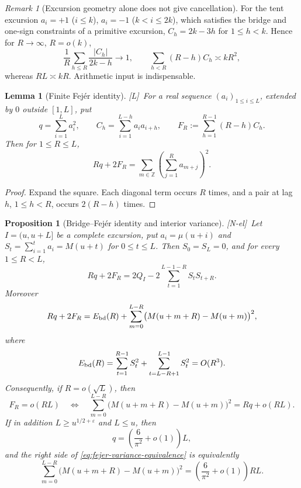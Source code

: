 \documentclass[11pt]{amsart}
\numberwithin{equation}{section}
\theoremstyle{plain}
\newtheorem{proposition}[theorem]{Proposition}
\newtheorem{lemma}[theorem]{Lemma}
\theoremstyle{definition}
\theoremstyle{remark}
\newtheorem{remark}[theorem]{Remark}
\newcommand{\eps}{\varepsilon}
\newcommand{\tagNE}{\textup{[N-el]}}
\newcommand{\tagL}{\textup{[L]}}
\begin{document}
\begin{remark}[Excursion geometry alone does not give cancellation]
\label{rem:tent-chowla}
For the tent excursion $a_i=+1$ ($i\le k$), $a_i=-1$ ($k<i\le2k$), which
satisfies the bridge and one-sign constraints of a primitive excursion,
$C_h=2k-3h$ for $1\le h<k$. Hence for $R\to\infty$, $R=o(k)$,
\[
\frac1R\sum_{h\le R}\frac{|C_h|}{2k-h}\longrightarrow1,
\qquad
\sum_{h<R}(R-h)C_h\asymp kR^2,
\]
whereas $RL\asymp kR$. Arithmetic input is indispensable.
\end{remark}

\begin{lemma}[Finite Fej\'er identity]
\label{lem:fejer}
\tagL\ For a real sequence $(a_i)_{1\le i\le L}$, extended by $0$ outside
$[1,L]$, put
\[
q=\sum_{i=1}^La_i^2,
\qquad
C_h=\sum_{i=1}^{L-h}a_ia_{i+h},
\qquad
F_R:=\sum_{h=1}^{R-1}(R-h)C_h.
\]
Then for $1\le R\le L$,
\begin{equation}
\label{eq:fejer}
Rq+2F_R
=\sum_{m\in\mathbb Z}\left(\sum_{j=1}^{R}a_{m+j}\right)^2.
\end{equation}
\end{lemma}

\begin{proof}
Expand the square. Each diagonal term occurs $R$ times, and a pair at lag
$h$, $1\le h<R$, occurs $2(R-h)$ times.
\end{proof}

\begin{proposition}[Bridge--Fej\'er identity and interior variance]
\label{prop:bridge-fejer}
\tagNE\ Let $I=(u,u+L]$ be a complete excursion, put
$a_i=\mu(u+i)$ and
$S_t=\sum_{i=1}^ta_i=M(u+t)$ for $0\le t\le L$. Then
$S_0=S_L=0$, and for every $1\le R<L$,
\begin{equation}
\label{eq:bridge-fejer-Q}
Rq+2F_R
=2Q_I-2\sum_{t=1}^{L-1-R}S_tS_{t+R}.
\end{equation}
Moreover
\begin{equation}
\label{eq:fejer-interior-boundary}
Rq+2F_R
=E_{\rm bd}(R)
+\sum_{m=0}^{L-R}\bigl(M(u+m+R)-M(u+m)\bigr)^2,
\end{equation}
where
\[
E_{\rm bd}(R)=\sum_{t=1}^{R-1}S_t^2
+\sum_{t=L-R+1}^{L-1}S_t^2
=O(R^3).
\]
Consequently, if $R=o(\sqrt L)$, then
\begin{equation}
\label{eq:fejer-variance-equivalence}
F_R=o(RL)
\quad\Longleftrightarrow\quad
\sum_{m=0}^{L-R}\bigl(M(u+m+R)-M(u+m)\bigr)^2
=Rq+o(RL).
\end{equation}
If in addition $L\ge u^{1/2+\eps}$ and $L\le u$, then
\begin{equation}
\label{eq:q-squarefree-local}
q=\left(\frac6{\pi^2}+o(1)\right)L,
\end{equation}
and the right side of \eqref{eq:fejer-variance-equivalence} is equivalently
\begin{equation}
\label{eq:local-variance-diagonal}
\sum_{m=0}^{L-R}\bigl(M(u+m+R)-M(u+m)\bigr)^2
=\left(\frac6{\pi^2}+o(1)\right)RL.
\end{equation}
\end{proposition}
\end{document}
